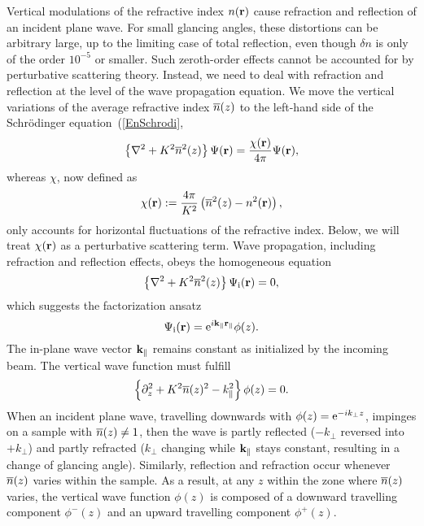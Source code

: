 Vertical modulations of the refractive index $n(\mathbf{r})$
cause refraction and reflection of an incident plane wave.
For small glancing angles,
these distortions can be arbitrary large,
up to the limiting case of total reflection,
even though $\delta n$ is only of the order $10^{-5}$ or smaller.
Such zeroth-order effects cannot be accounted for
by perturbative scattering theory.
Instead, we need to deal with refraction and reflection
at the level of the wave propagation equation.
We move the vertical variations of the average refractive index $\overline{n}(z)$
to the left-hand side of the Schrödinger equation~(\ref{EnSchrodi},
\begin{equation}\label{EHelmholtzGraded}
  \left\{\mathbf{\nabla}^2+K^2\overline{n}^2(z)\right\}\Psi(\mathbf{r})
  = \frac{\chi(\mathbf{r})}{4\pi}\Psi(\mathbf{r}),
\end{equation}
whereas $\chi$, now defined as
\begin{equation}\label{EChiGraded}
  \chi(\mathbf{r}) := \frac{4\pi}{K^2}\left(\overline{n}^2(z)-n^2(\mathbf{r})\right),
\end{equation}
only accounts for horizontal fluctuations of the refractive index.
Below, we will treat $\chi(\mathbf{r})$ as a perturbative scattering term.
Wave propagation, including refraction and reflection effects,
obeys the homogeneous equation
\begin{equation}\label{EHelmholtzGradedHomog}
  \left\{\mathbf{\nabla}^2+K^2\overline{n}^2(z)\right\}\Psi_\text{i}(\mathbf{r}) = 0,
\end{equation}
which suggests the factorization ansatz
\begin{equation}\label{Ekpar}
\Psi_\text{i}(\mathbf{r}) = {\rm e}^{i \mathbf{k}_\parallel\mathbf{r}_\parallel} \phi(z).
\end{equation}
The in-plane wave vector $\mathbf{k}_\parallel$ remains constant
as initialized by the incoming beam.
The vertical wave function must fulfill
\begin{equation}\label{Ewavez}
\left\{\partial_z^2 + K^2\overline{n}(z)^2 - k_\parallel^2 \right\} \phi(z) = 0.
\end{equation}
When an incident plane wave,
travelling downwards with
$\phi(z)={\rm e}^{-ik_\perp z}$,
impinges on a sample with $\overline{n}(z)\ne 1$,
then the wave is partly reflected ($-k_\perp$ reversed into $+k_\perp$)
and partly refracted
($k_\perp$ changing while $\mathbf{k}_\parallel$ stays constant,
resulting in a change of glancing angle).
Similarly, reflection and refraction occur
whenever $\overline{n}(z)$ varies within the sample.
As a result, at any $z$ within the zone where $\overline{n}(z)$ varies,
the vertical wave function $\phi(z)$ is composed of a
downward travelling component $\phi^-(z)$
and an upward travelling component $\phi^+(z)$.

